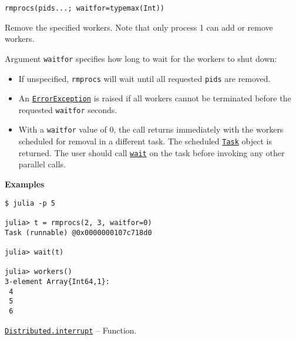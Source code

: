 \begin{adjustwidth}{2em}{0pt}


\begin{verbatim}
rmprocs(pids...; waitfor=typemax(Int))
\end{verbatim}

Remove the specified workers. Note that only process 1 can add or remove workers.

Argument \texttt{waitfor} specifies how long to wait for the workers to shut down:

\begin{itemize}
\item If unspecified, \texttt{rmprocs} will wait until all requested \texttt{pids} are removed.


\item An \hyperlink{12102596058483452470}{\texttt{ErrorException}} is raised if all workers cannot be terminated before the requested \texttt{waitfor} seconds.


\item With a \texttt{waitfor} value of 0, the call returns immediately with the workers scheduled for removal in a different task. The scheduled \hyperlink{7131243650304654155}{\texttt{Task}} object is returned. The user should call \hyperlink{13761789780433862250}{\texttt{wait}} on the task before invoking any other parallel calls.

\end{itemize}
\textbf{Examples}


\begin{verbatim}
$ julia -p 5

julia> t = rmprocs(2, 3, waitfor=0)
Task (runnable) @0x0000000107c718d0

julia> wait(t)

julia> workers()
3-element Array{Int64,1}:
 4
 5
 6
\end{verbatim}



\end{adjustwidth}
\hypertarget{15554950403613599151}{} 
\hyperlink{15554950403613599151}{\texttt{Distributed.interrupt}}  -- {Function.}

